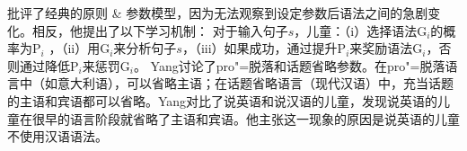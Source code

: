 \citet[]{Yang2004a}批评了经典的原则 \& 参数模型，因为无法观察到设定参数后语法之间的急剧变化。相反，他提出了以下学习机制：
\ea
对于输入句子$s$，儿童：（i）选择语法G$_i$的概率为P$_i$ ，（ii）用G$_i$来分析句子$s$，（iii）如果成功，通过提升P$_i$来奖励语法G$_i$，否则通过降低P$_i$来惩罚G$_i$。
\z
Yang讨论了pro"=脱落和话题省略参数。在pro"=脱落语言中（如意大利语），可以省略主语；在话题省略语言（\egc 现代汉语）中，充当话题的主语和宾语都可以省略。Yang对比了说英语和说汉语的儿童，发现说英语的儿童在很早的语言阶段就省略了主语和宾语。他主张这一现象的原因是说英语的儿童不使用汉语语法。

